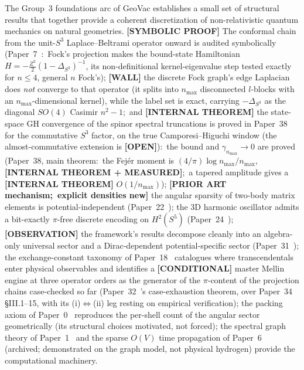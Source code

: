 \documentclass[aps,pra,twocolumn,superscriptaddress,longbibliography]{revtex4-2}
\newcommand{\gvc}[2]{#2}
\begin{document}
The Group~3 foundations arc of GeoVac establishes a small set of
structural results that together provide a coherent discretization of
non-relativistic quantum mechanics on natural geometries.
\textbf{[SYMBOLIC PROOF]} The conformal chain from the unit-$S^3$
Laplace--Beltrami operator onward is audited symbolically
(Paper~7~\cite{loutey_paper7}:\ Fock's projection makes the bound-state
Hamiltonian $H = -\tfrac{Z^2}{2}(1-\Delta_{S^3})^{-1}$, its non-definitional
kernel-eigenvalue step tested exactly for $n \le 4$, general $n$
Fock's); \textbf{[WALL]} the discrete Fock
\gvc{graph-s3-wall}{graph's edge Laplacian does \emph{not} converge to that operator (it
splits into $n_{\max}$ disconnected $l$-blocks with an
$n_{\max}$-dimensional kernel)}, while the label set is exact, carrying
$-\Delta_{S^3}$ as the diagonal $SO(4)$ Casimir $n^2 - 1$;\ and
\textbf{[INTERNAL THEOREM]} \gvc{wh1-p38-gh-convergence}{the state-space GH convergence of the spinor
spectral truncations is proved in Paper~38~\cite{loutey_paper38} for the
commutative $S^3$ factor, on the true Camporesi--Higuchi window (the
almost-commutative extension is \textbf{[OPEN]})}:\ the
bound and $\gamma_{n_{\max}} \to 0$ are proved (Paper~38, main theorem:\ the
\gvc{p38-rate-constant}{Fej\'er moment is $(4/\pi)\log n_{\max}/n_{\max}$, \textbf{[INTERNAL THEOREM +
MEASURED]};\ a tapered amplitude gives a \textbf{[INTERNAL THEOREM]} $O(1/n_{\max})$}); \textbf{[PRIOR ART mechanism;\ explicit
densities new]} the angular sparsity of two-body matrix elements is potential-independent
(Paper~22~\cite{loutey_paper22}); the 3D harmonic oscillator admits a
bit-exactly $\pi$-free discrete encoding on $H^2(S^5)$
(Paper~24~\cite{loutey_paper24}); \textbf{[OBSERVATION]} the framework's results decompose
cleanly into an algebra-only universal sector and a Dirac-dependent
potential-specific sector (Paper~31~\cite{loutey_paper31}); the
exchange-constant taxonomy of Paper~18~\cite{loutey_paper18} catalogues
where transcendentals enter physical observables and identifies a
\gvc{pi-source-case-exhaustion}{\textbf{[CONDITIONAL]} master Mellin engine at three operator orders as the generator of the
$\pi$-content of the projection chains case-checked so far (Paper~32~\cite{loutey_paper32}'s
case-exhaustion theorem, over Paper~34 \S III.1--15, with its
(i)$\Leftrightarrow$(ii) leg resting on empirical verification)}; the
packing axiom of
Paper~0~\cite{loutey_paper0} reproduces the per-shell count of the
angular sector geometrically (its structural choices motivated, not forced);
the spectral graph theory of Paper~1~\cite{loutey_paper1} and the
sparse $O(V)$ time propagation of Paper~6~\cite{loutey_paper6}
(archived; demonstrated on the graph model, not physical hydrogen)
provide the computational machinery.
\end{document}
